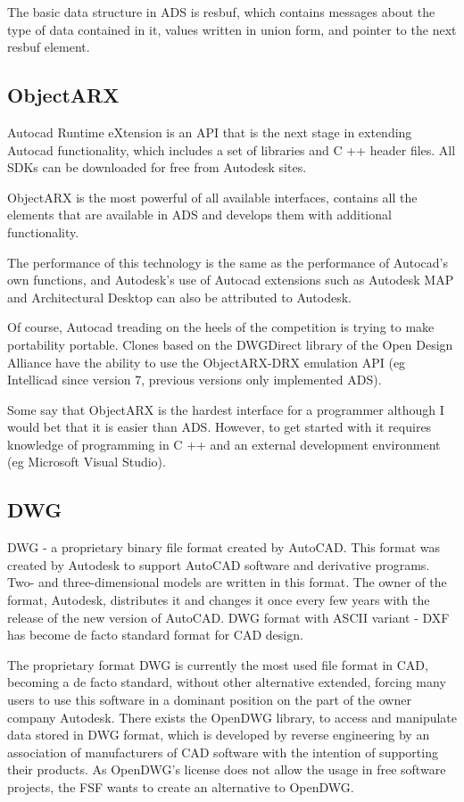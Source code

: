 \documentclass[a4paper, 11pt, article]{report}
\begin{document}
The basic data structure in ADS is resbuf, which contains messages about the type of data contained in it, values written in union form, and pointer to the next resbuf element.
 
\subsection{ObjectARX}

Autocad Runtime eXtension is an API that is the next stage in extending Autocad functionality, which includes a set of libraries and C ++ header files. All SDKs can be downloaded for free from Autodesk sites.

ObjectARX is the most powerful of all available interfaces, contains all the elements that are available in ADS and develops them with additional functionality.

The performance of this technology is the same as the performance of Autocad's own functions, and Autodesk's use of Autocad extensions such as Autodesk MAP and Architectural Desktop can also be attributed to Autodesk.

Of course, Autocad treading on the heels of the competition is trying to make portability portable. Clones based on the DWGDirect library of the Open Design Alliance have the ability to use the ObjectARX-DRX emulation API (eg Intellicad since version 7, previous versions only implemented ADS).

Some say that ObjectARX is the hardest interface for a programmer although I would bet that it is easier than ADS. However, to get started with it requires knowledge of programming in C ++ and an external development environment (eg Microsoft Visual Studio).

\subsection{DWG}
   
DWG - a proprietary binary file format created by AutoCAD.
This format was created by Autodesk to support AutoCAD software and derivative programs. Two- and three-dimensional models are written in this format. The owner of the format, Autodesk, distributes it and changes it once every few years with the release of the new version of AutoCAD.
DWG format with ASCII variant - DXF has become de facto standard format for CAD design.

The proprietary format DWG is currently the most used file format in CAD, becoming a de facto standard, without other alternative extended, forcing many users to use this software in a dominant position on the part of the owner company Autodesk.
There exists the OpenDWG library, to access and manipulate data stored in DWG format, which is developed by reverse engineering by an association of manufacturers of CAD software with the intention of supporting their products. As OpenDWG's license does not allow the usage in free software projects, the FSF wants to create an alternative to OpenDWG.
\end{document}
